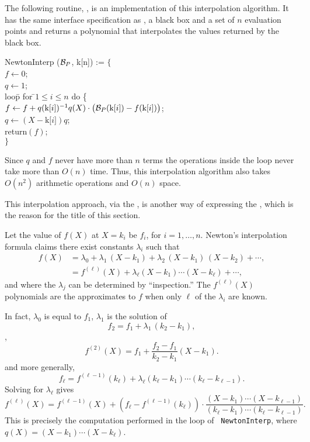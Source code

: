 The following routine, , is an implementation of
this interpolation algorithm.  It has the same interface specification as 
, a black box and a set of $n$ evaluation points and
returns a polynomial that interpolates the values returned by the
black box.

\begindsacode
NewtonInterp (${\cal B}_P$, k[n]) := $\{$\\
\> $f \leftarrow 0$; \\
\> $q \leftarrow 1$; \\
\> loo\=p for \=$1 \le i \le n$ do \{ \\
\> \> $f \leftarrow f + q(\mbox{k[$i$]})^{-1} q(X) \cdot
    \bigl({\cal B}_P(\mbox{k[$i$]}) - f(\mbox{k[$i$]})\bigr)$; \\
\> \> $q \leftarrow (X - \mbox{k[$i$]}) q$; \\
\> return$(f)$;\\
\> $\}$
\enddsacode

Since $q$ and $f$ never have more than $n$ terms the
operations inside the loop never take more than $O(n)$ time.  Thus,
this interpolation algorithm also takes $O(n^2)$ arithmetic operations
and $O(n)$ space.


\medskip
This interpolation approach, via the , is
another way of expressing the ,
which is the reason for the title of this section. 


Let the value of $f(X)$ at $X = k_i$ be $f_i$, for $i = 1, \ldots, n$.
Newton's interpolation formula claims there exist constants
$\lambda_i$ such that
\[
\begin{aligned}
f(X) & = \lambda_0 + \lambda_1\, (X - k_1) 
  + \lambda_2 \, (X - k_1)\, (X - k_2) + \cdots, \\
  & = f^{(\ell)}(X) + \lambda_{\ell} (X - k_1) \cdots (X - k_{\ell})
+ \cdots, 
\end{aligned}
\]
and where the $\lambda_j$ can be determined by ``inspection.''  The
$f^{(\ell)}(X)$ polynomials are the approximates to $f$ when only
${\ell}$ of the $\lambda_i$ are known.

In fact, $\lambda_0$ is equal to $f_1$, $\lambda_1$ is the solution of
\[
f_2 = f_1 + \lambda_1 \, (k_2 - k_1),
\]
\ie,
\[
f^{(2)}(X) = f_1 + \frac{f_2 - f_1}{k_2 - k_1} (X - k_1).
\]
and more generally,
\[
f_{\ell} = f^{(\ell -1)}(k_{\ell}) + \lambda_{\ell} (k_{\ell} - k_1)
\cdots (k_{\ell} - k_{\ell-1}).
\]
Solving for $\lambda_{\ell}$ gives
\[
f^{(\ell)}(X) = f^{(\ell-1)}(X) 
  + \left(f_{\ell} - f^{(\ell-1)}(k_{\ell})\right)\cdot
  \frac{(X - k_1) \cdots (X - k_{\ell-1})}{(k_{\ell} - k_1) \cdots (k_{\ell} - k_{\ell-1})}.
\]
This is precisely the computation performed in the loop of {\tt
NewtonInterp}, where $q(X) = (X - k_1) \cdots (X - k_{\ell})$.

